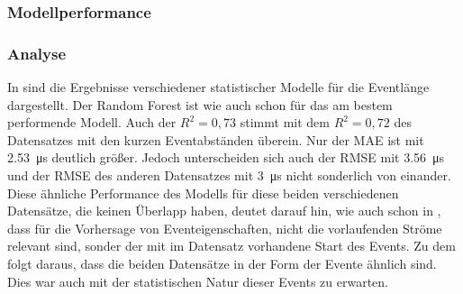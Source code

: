 \subsubsection{Modellperformance}

\begin{table}[h!]
\centering
\caption{Model Performance für die Vorhersage der Eventlänge}
\label{tab:long_event_duration}
\end{table}


\subsubsection{Analyse}
In  sind die Ergebnisse verschiedener statistischer Modelle für die Eventlänge dargestellt. Der Random Forest ist wie auch schon für  das am bestem performende Modell. Auch der \(R^2 = 0,73\) stimmt mit dem \(R^2 = 0,72\) des Datensatzes mit den kurzen Eventabständen überein. Nur der MAE ist mit \SI{2,53}{\micro\second} deutlich größer. Jedoch unterscheiden sich auch der RMSE mit \SI{3,56}{\micro\second} und der RMSE des anderen Datensatzes mit \SI{3}{\micro\second} nicht sonderlich von einander. Diese ähnliche Performance des Modells für diese beiden verschiedenen Datensätze, die keinen Überlapp haben, deutet darauf hin, wie auch schon in , dass für die Vorhersage von Eventeigenschaften, nicht die vorlaufenden Ströme relevant sind, sonder der mit im Datensatz vorhandene Start des Events. Zu dem folgt daraus, dass die beiden Datensätze in der Form der Evente ähnlich sind. Dies war auch mit der statistischen Natur dieser Events zu erwarten.







